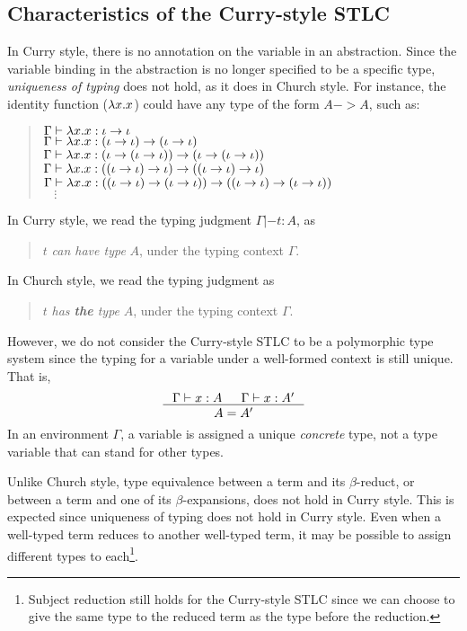 \subsection{Characteristics of the Curry-style STLC}\label{sec:stlc:curry}
In Curry style, there is no annotation on the variable in an abstraction.
Since the variable binding in the abstraction is no longer specified to be
a specific type, \emph{uniqueness of typing} does not hold,
as it does in Church style. For instance, the identity function ($\lambda x.x$)
could have any type of the form $A -> A$, such as:
\begin{quote}\vspace*{-1em}
\begin{singlespace}
$\Gamma |- \lambda x.x : \iota -> \iota$ \\
$\Gamma |- \lambda x.x : (\iota -> \iota) -> (\iota -> \iota)$ \\
$\Gamma |- \lambda x.x : (\iota -> (\iota -> \iota)) -> (\iota -> (\iota -> \iota))$ \\
$\Gamma |- \lambda x.x : ((\iota -> \iota) -> \iota) -> ((\iota -> \iota) -> \iota)$ \\
$\Gamma |- \lambda x.x : ((\iota -> \iota) -> (\iota -> \iota)) -> ((\iota -> \iota) -> (\iota -> \iota))$ \\
$~~~~ \vdots $
\end{singlespace}
\end{quote}
In Curry style, we read the typing judgment $\Gamma |- t : A$,  as
\begin{quote}
$t$ \emph{can have type} $A$, under the typing context $\Gamma$.
\end{quote}
In Church style, we read the typing judgment as
\begin{quote}
$t$ \emph{has {\bf the} type} $A$, under the typing context $\Gamma$.
\end{quote}
However, we do not consider the Curry-style STLC to be
a polymorphic type system since the typing for a variable
under a well-formed context is still unique. That is,
\[ \inference{\Gamma |- x : A & \Gamma |- x : A'}{A = A'} \]
In an environment $\Gamma$, a variable is assigned a unique {\em concrete}
type, not a type variable that can stand for other types.


Unlike Church style, type equivalence between a term and its $\beta$-reduct, or between
a term and one of its $\beta$-expansions, does not hold in Curry style.
This is expected since uniqueness of typing does not hold in Curry style.
Even when a well-typed term reduces to another well-typed term, it may be possible
to assign different types to each\footnote{Subject reduction still holds for
the Curry-style STLC since we can choose to give the same type to
the reduced term as the type before the reduction.}.

